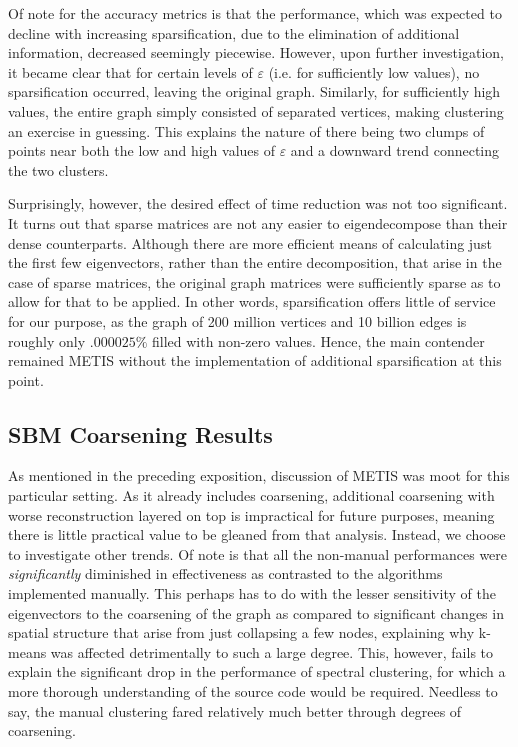 \documentclass{article}
\begin{document}
Of note for the accuracy metrics is that the performance, which was expected to decline with increasing sparsification, due to the elimination of additional information, decreased seemingly piecewise. However, upon further investigation, it became clear that for certain levels of $\varepsilon$ (i.e. for sufficiently low values), no sparsification occurred, leaving the original graph. Similarly, for sufficiently high values, the entire graph simply consisted of separated vertices, making clustering an exercise in guessing. This explains the nature of there being two clumps of points near both the low and high values of $\varepsilon$ and a downward trend connecting the two clusters.

Surprisingly, however, the desired effect of time reduction was not too significant. It turns out that sparse matrices are not any easier to eigendecompose than their dense counterparts. Although there are more efficient means of calculating just the first few eigenvectors, rather than the entire decomposition, that arise in the case of sparse matrices, the original graph matrices were sufficiently sparse as to allow for that to be applied. In other words, sparsification offers little of service for our purpose, as the graph of 200 million vertices and 10 billion edges is roughly only $.000025\%$ filled with non-zero values. Hence, the main contender remained METIS without the implementation of additional sparsification at this point.

\subsection{SBM Coarsening Results}
As mentioned in the preceding exposition, discussion of METIS was moot for this particular setting. As it already includes coarsening, additional coarsening with worse reconstruction layered on top is impractical for future purposes, meaning there is little practical value to be gleaned from that analysis. Instead, we choose to investigate other trends. Of note is that all the non-manual performances were \textit{significantly} diminished in effectiveness as contrasted to the algorithms implemented manually. This perhaps has to do with the lesser sensitivity of the eigenvectors to the coarsening of the graph as compared to significant changes in spatial structure that arise from just collapsing a few nodes, explaining why k-means was affected detrimentally to such a large degree. This, however, fails to explain the significant drop in the performance of spectral clustering, for which a more thorough understanding of the source code would be required. Needless to say, the manual clustering fared relatively much better through degrees of coarsening.
\end{document}

